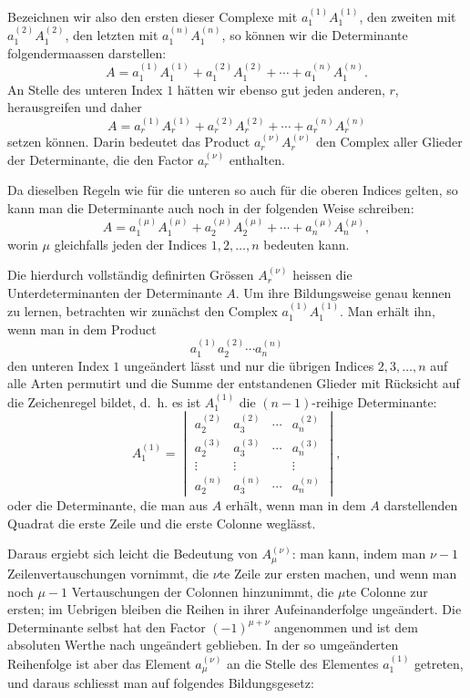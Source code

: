 \documentclass[11pt]{article}
\begin{document}
Bezeichnen wir also den ersten dieser Complexe mit \(a_1^{(1)}A_1^{(1)}\), den zweiten mit \(a_1^{(2)}A_1^{(2)}\), den letzten mit \(a_1^{(n)}A_1^{(n)}\), so können wir die Determinante folgendermaassen darstellen:
\begin{equation}
A=a_1^{(1)}A_1^{(1)}+a_1^{(2)}A_1^{(2)}+\cdots+a_1^{(n)}A_1^{(n)}.
\tag{1}
\end{equation}
An Stelle des unteren Index \(1\) hätten wir ebenso gut jeden anderen, \(r\), herausgreifen und daher
\begin{equation}
A=a_r^{(1)}A_r^{(1)}+a_r^{(2)}A_r^{(2)}+\cdots+a_r^{(n)}A_r^{(n)}
\tag{2}
\end{equation}
setzen können. Darin bedeutet das Product \(a_r^{(\nu)}A_r^{(\nu)}\) den Complex aller Glieder der Determinante, die den Factor \(a_r^{(\nu)}\) enthalten.

Da dieselben Regeln wie für die unteren so auch für die oberen Indices gelten, so kann man die Determinante auch noch in der folgenden Weise schreiben:
\begin{equation}
A=a_1^{(\mu)}A_1^{(\mu)}+a_2^{(\mu)}A_2^{(\mu)}+\cdots+a_n^{(\mu)}A_n^{(\mu)},
\tag{3}
\end{equation}
worin \(\mu\) gleichfalls jeden der Indices \(1,2,\ldots,n\) bedeuten kann.

Die hierdurch vollständig definirten Grössen \(A_r^{(\nu)}\) heissen die Unterdeterminanten der Determinante \(A\). Um ihre Bildungsweise genau kennen zu lernen, betrachten wir zunächst den Complex \(a_1^{(1)}A_1^{(1)}\). Man erhält ihn, wenn man in dem Product
\[
a_1^{(1)}a_2^{(2)}\cdots a_n^{(n)}
\]
den unteren Index \(1\) ungeändert lässt und nur die übrigen Indices \(2,3,\ldots,n\) auf alle Arten permutirt und die Summe der entstandenen Glieder mit Rücksicht auf die Zeichenregel bildet, d.~h. es ist \(A_1^{(1)}\) die \((n-1)\)-reihige Determinante:
\begin{equation}
A_1^{(1)}=
\begin{vmatrix}
a_2^{(2)}&a_3^{(2)}&\cdots&a_n^{(2)}\\
a_2^{(3)}&a_3^{(3)}&\cdots&a_n^{(3)}\\
\vdots&\vdots&&\vdots\\
a_2^{(n)}&a_3^{(n)}&\cdots&a_n^{(n)}
\end{vmatrix},
\tag{4}
\end{equation}
oder die Determinante, die man aus \(A\) erhält, wenn man in dem \(A\) darstellenden Quadrat die erste Zeile und die erste Colonne weglässt.

Daraus ergiebt sich leicht die Bedeutung von \(A_\mu^{(\nu)}\): man kann, indem man \(\nu-1\) Zeilenvertauschungen vornimmt, die \(\nu\)te Zeile zur ersten machen, und wenn man noch \(\mu-1\) Vertauschungen der Colonnen hinzunimmt, die \(\mu\)te Colonne zur ersten; im Uebrigen bleiben die Reihen in ihrer Aufeinanderfolge ungeändert. Die Determinante selbst hat den Factor \((-1)^{\mu+\nu}\) angenommen und ist dem absoluten Werthe nach ungeändert geblieben. In der so umgeänderten Reihenfolge ist aber das Element \(a_\mu^{(\nu)}\) an die Stelle des Elementes \(a_1^{(1)}\) getreten, und daraus schliesst man auf folgendes Bildungsgesetz:
\end{document}
